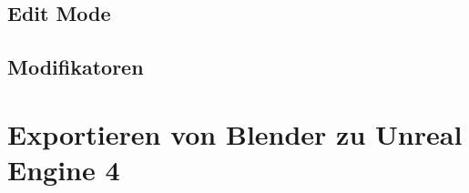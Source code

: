 \subsection{Edit Mode}
\subsection{Modifikatoren}
\section{Exportieren von Blender zu Unreal Engine 4}
\label{chap:Exportieren_von_Blender_zu_Unreal_Engine_4}